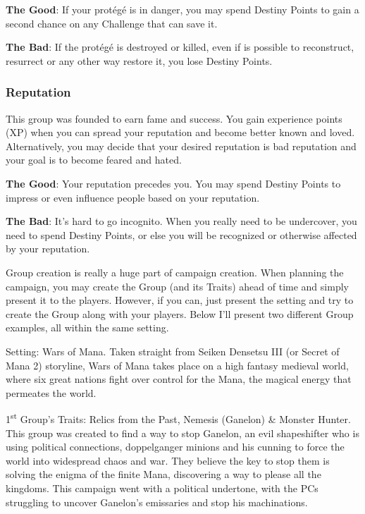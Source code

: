 \begin{multicols}{2}
\textbf{The Good}: If your protégé is in danger, you
may spend Destiny Points to gain a second chance
on any Challenge that can save it.

\textbf{The Bad}: If the protégé is destroyed or
killed, even if is possible to reconstruct, resurrect
or any other way restore it, you lose Destiny Points.

\subsubsection{Reputation}
This group was founded to earn fame and
success. You gain experience points (XP) when you
can spread your reputation and become better
known and loved. Alternatively, you may decide
that your desired reputation is bad reputation and
your goal is to become feared and hated.

\textbf{The Good}: Your reputation precedes you.
You may spend Destiny Points to impress or even
influence people based on your reputation.

\textbf{The Bad}: It's hard to go incognito. When
you really need to be undercover, you need to
spend Destiny Points, or else you will be
recognized or otherwise affected by your
reputation.

\begin{mog}
Group creation is really a huge part of campaign
creation. When planning the campaign, you may create
the Group (and its Traits) ahead of time and simply
present it to the players. However, if you can, just present
the setting and try to create the Group along with your
players. Below I'll present two different Group examples,
all within the same setting.

Setting: Wars of Mana. Taken straight from Seiken
Densetsu III (or Secret of Mana 2) storyline, Wars of
Mana takes place on a high fantasy medieval world, where
six great nations fight over control for the Mana, the
magical energy that permeates the world.

1\textsuperscript{st} Group's Traits: Relics from the Past, Nemesis
(Ganelon) \& Monster Hunter. This group was created to
find a way to stop Ganelon, an evil shapeshifter who is
using political connections, doppelganger minions and his
cunning to force the world into widespread chaos and war.
They believe the key to stop them is solving the enigma
of the finite Mana, discovering a way to please all the
kingdoms. This campaign went with a political undertone,
with the PCs struggling to uncover Ganelon's emissaries
and stop his machinations.


\end{mog}
\end{multicols}
